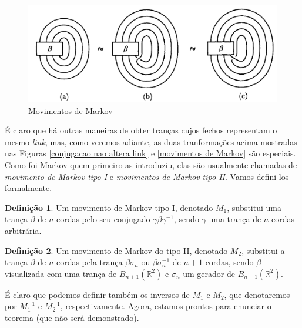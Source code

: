 \documentclass[a4paper,portuguese,11pt,twoside, leqno]{book}
\theoremstyle{definition}
\newtheorem{deff}{Definição}[section]
\begin{document}
	\begin{figure}[H]
		\begin{center}
			\includegraphics[width=13cm]{Images/movimentos_de_markov.png}
		\end{center}\caption{Movimentos de Markov}
		\label{movimentos de Markov}
	\end{figure}
	\par\vspace{0.3cm} É claro que há outras maneiras de obter tranças cujos fechos representam o mesmo \textit{link}, mas, como veremos adiante, as duas tranformações acima mostradas nas Figuras \eqref{conjugacao nao altera link} e \eqref{movimentos de Markov} são especiais. Como foi Markov quem primeiro as introduziu, elas são usualmente chamadas de \textit{movimento de Markov tipo I} e \textit{movimentos de Markov tipo II}. Vamos defini-los formalmente.
	\begin{deff}
		\label{def movimento de Markov tipo 1}
		Um movimento de Markov tipo I, denotado $M_1$, substitui uma trança $\beta$ de $n$ cordas pelo seu conjugado $\gamma\beta\gamma^{-1}$, sendo $\gamma$ uma trança de $n$ cordas arbitrária.  
	\end{deff}
	\begin{deff}
		\label{def movimento de Markov tipo 2}
		Um movimento de Markov do tipo II, denotado $M_2$, substitui a trança $\beta$ de $n$ cordas pela trança $\beta\sigma_n$ ou $\beta\sigma_n^{-1}$ de $n+1$ cordas, sendo $\beta$ visualizada com uma trança de $B_{n+1}(\mathbb{R}^2)$ e $\sigma_n$ um gerador de $B_{n+1}(\mathbb{R}^2)$. 
	\end{deff}
	\par\vspace{0.3cm} É claro que podemos definir também os inversos de $M_1$ e $M_2$, que denotaremos por $M_1^{-1}$ e $M_2^{-1}$, respectivamente. Agora, estamos prontos para enunciar o teorema (que não será demonstrado).
	
\end{document}

